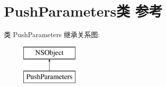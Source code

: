 \hypertarget{interface_push_parameters}{}\section{Push\+Parameters类 参考}
\label{interface_push_parameters}
类 Push\+Parameters 继承关系图\+:\begin{figure}[H]
\begin{center}
\leavevmode
\includegraphics[height=2.000000cm]{interface_push_parameters}
\end{center}
\end{figure}
